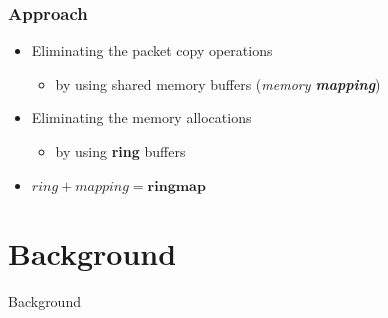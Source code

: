 \documentclass{beamer}
\begin{document}
\begin{frame}
\frametitle{Approach}
\begin{itemize}
	\item<1-> Eliminating the packet copy operations
		\begin{itemize}
			\item<1-> by using shared memory buffers (\emph{memory \textbf{mapping}})\newline
		\end{itemize}
	\item<1-> Eliminating the memory allocations
		\begin{itemize}
			\item<1-> by using \textbf{ring} buffers\newline \newline
		\end{itemize}
	\item<2->[$\Rightarrow$] $ring + mapping = \textbf{ringmap}$
\end{itemize}
\end{frame}

\section{Background}
\begin{frame}
	\begin{center}
	\huge{Background}
	\end{center}
\end{frame}
\end{document}
